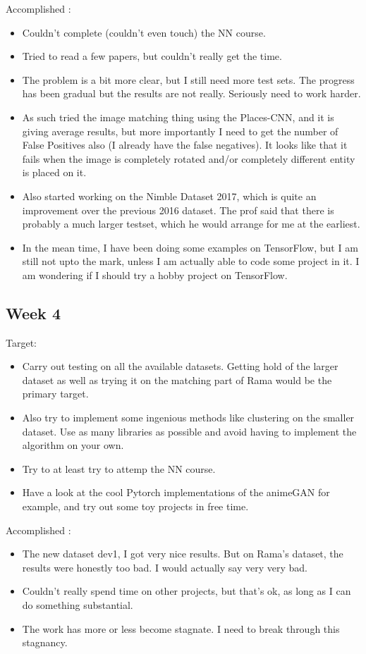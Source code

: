 \documentclass{article}
\begin{document}
Accomplished :
\begin{itemize}
\item Couldn't complete (couldn't even touch) the NN course.
\item Tried to read a few papers, but couldn't really get the time.
\item The problem is a bit more clear, but I still need more test sets. The progress has been gradual but the results are not really. Seriously need to work harder.
\item As such tried the image matching thing using the Places-CNN, and it is giving average results, but more importantly I need to get the number of False Positives also (I already have the false negatives). It looks like that it fails when the image is completely rotated and/or completely different entity is placed on it.
\item Also started working on the Nimble Dataset 2017, which is quite an improvement over the previous 2016 dataset. The prof said that there is probably a much larger testset, which he would arrange for me at the earliest.
\item In the mean time, I have been doing some examples on TensorFlow, but I am still not upto the mark, unless I am actually able to code some project in it. I am wondering if I should try a hobby project on TensorFlow.
\end{itemize}

\subsection{Week 4}
Target:
\begin{itemize}
\item Carry out testing on all the available datasets. Getting hold of the larger dataset as well as trying it on the matching part of Rama would be the primary target.
\item Also try to implement some ingenious methods like clustering on the smaller dataset. Use as many libraries as possible and avoid having to implement the algorithm on your own.
\item Try to at least try to attemp the NN course.
\item Have a look at the cool Pytorch implementations of the animeGAN for example, and try out some toy projects in free time.
\end{itemize}

Accomplished :
\begin{itemize}
\item The new dataset dev1, I got very nice results. But on Rama's dataset, the results were honestly too bad. I would actually say very very bad.
\item Couldn't really spend time on other projects, but that's ok, as long as I can do something substantial.
\item The work has more or less become stagnate. I need to break through this stagnancy.
\end{itemize}
\end{document}
